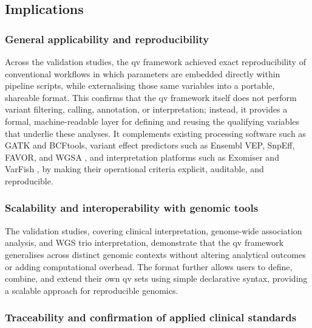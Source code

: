 \subsection{Implications}
\subsubsection{General applicability and reproducibility}

Across the validation studies, the \ac{qv} framework achieved exact reproducibility of conventional workflows in which parameters are embedded directly within pipeline scripts, while externalising those same variables into a portable, shareable format. This confirms that the \ac{qv} framework itself does not perform variant filtering, calling, annotation, or interpretation; instead, it provides a formal, machine-readable layer for defining and reusing the qualifying variables that underlie these analyses. It complements existing processing software such as GATK and BCFtools, variant effect predictors such as Ensembl VEP, SnpEff, FAVOR, and WGSA \cite{2024riccioVariantEffectPredictors}, and interpretation platforms such as Exomiser and VarFish \cite{2020ciprianiImprovedPhenotypeDrivenTool, 2020holtgreweVarFishComprehensiveDNA}, by making their operational criteria explicit, auditable, and reproducible.

\subsubsection{Scalability and interoperability with genomic tools}

The validation studies, covering clinical interpretation, genome-wide association analysis, and WGS trio interpretation, demonstrate that the \ac{qv} framework generalises across distinct genomic contexts without altering analytical outcomes or adding computational overhead. The format further allows users to define, combine, and extend their own \ac{qv} sets using simple declarative syntax, providing a scalable approach for reproducible genomics.

\subsubsection{Traceability and confirmation of applied clinical standards}

